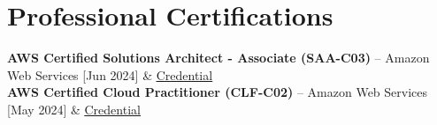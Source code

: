 \documentclass[a4paper,10pt]{article}
\begin{document}
\newcommand{\certificateName}[3]{\textbf{#1} -- #2 [#3]}
\newcommand{\certificateItem}[4]{\certificateName{#1}{#2}{#3} & \href{#4}{\underline{Credential}}\\}
\newenvironment{spacedtabular*}[1]
{\setlength{\extrarowheight}{1pt}\begin{tabular*}{#1}{>{\small}l @{\extracolsep{\fill}} >{\bfseries \small}r}}
    {\end{tabular*}}

\section{Professional Certifications}
\begin{spacedtabular*}{\linewidth}
  \certificateItem{AWS Certified Solutions Architect - Associate (SAA-C03)}{Amazon Web Services}{Jun 2024}{https://www.credly.com/badges/0e244f55-8973-4585-a933-a1369373e64e/linked_in_profile}



  \certificateItem{AWS Certified Cloud Practitioner (CLF-C02)}{Amazon Web Services}{May 2024}{https://www.credly.com/badges/36128c13-eafd-4d72-96fc-c8e78f9ba320/linked_in_profile}








\end{spacedtabular*}
\end{document}
